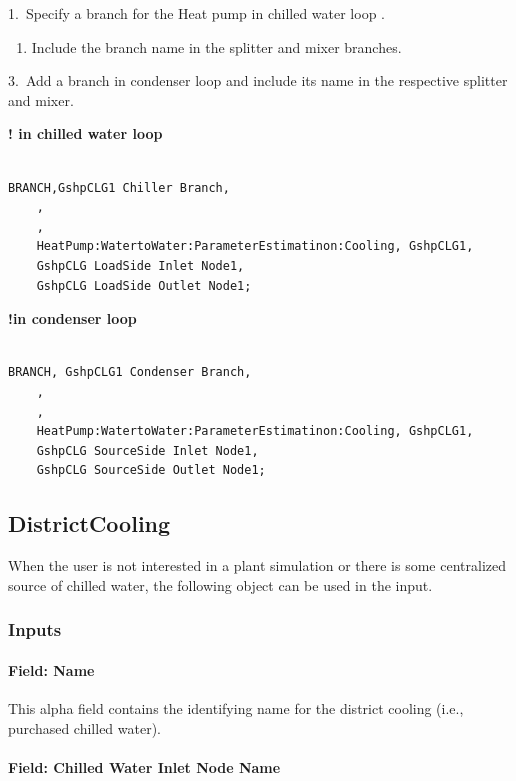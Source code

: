 1.~Specify a branch for the Heat pump in chilled water loop .

\begin{enumerate}
    \def\labelenumi{\arabic{enumi}.}
    \setcounter{enumi}{1}
    \tightlist
    \item
    Include the branch name in the splitter and mixer branches.
\end{enumerate}

3.~Add a branch in condenser loop and include its name in the respective splitter and mixer.

\textbf{! in chilled water loop}

\begin{lstlisting}

BRANCH,GshpCLG1 Chiller Branch,
    ,
    ,
    HeatPump:WatertoWater:ParameterEstimatinon:Cooling, GshpCLG1,
    GshpCLG LoadSide Inlet Node1,
    GshpCLG LoadSide Outlet Node1;
\end{lstlisting}

\textbf{!in condenser loop}

\begin{lstlisting}

BRANCH, GshpCLG1 Condenser Branch,
    ,
    ,
    HeatPump:WatertoWater:ParameterEstimatinon:Cooling, GshpCLG1,
    GshpCLG SourceSide Inlet Node1,
    GshpCLG SourceSide Outlet Node1;
\end{lstlisting}

\subsection{DistrictCooling}\label{districtcooling}

When the user is not interested in a plant simulation or there is some centralized source of chilled water, the following object can be used in the input.

\subsubsection{Inputs}\label{inputs-16-008}

\paragraph{Field: Name}\label{field-name-15-006}

This alpha field contains the identifying name for the district cooling (i.e., purchased chilled water).

\paragraph{Field: Chilled Water Inlet Node Name}\label{field-chilled-water-inlet-node-name-9}

